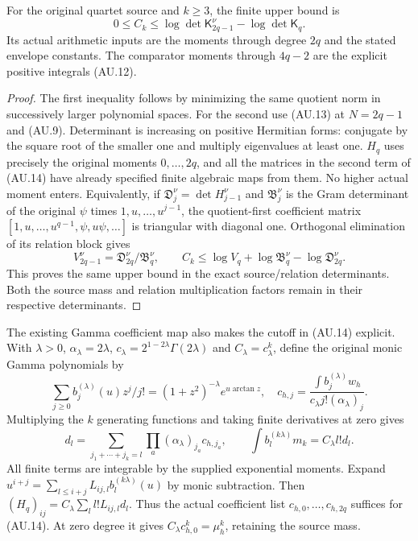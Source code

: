 \begin{theorem}
For the original quartet source and $k\ge3$, the finite upper bound is
\[
 \boxed{0\le C_k\le
 \log\det\mathsf K_{2q-1}^\nu-\log\det\mathsf K_q.}        \tag{AU.14}
\]
Its actual arithmetic inputs are the moments through degree $2q$ and
the stated envelope constants. The comparator moments through $4q-2$
are the explicit positive integrals (AU.12).
\end{theorem}
\begin{proof}
The first inequality follows by minimizing the same quotient norm in
successively larger polynomial spaces. For the second use (AU.13) at
$N=2q-1$ and (AU.9). Determinant is increasing on positive Hermitian
forms: conjugate by the square root of the smaller one and multiply
eigenvalues at least one. $H_q$ uses precisely the original moments
$0,\ldots,2q$, and all the matrices in the second term of (AU.14) have
already specified finite algebraic maps from them. No higher actual
moment enters. Equivalently, if $\mathfrak D^\nu_j=\det H_{j-1}^\nu$
and $\mathfrak B^\nu_j$ is the Gram determinant of the original
$\psi$ times $1,u,\ldots,u^{j-1}$, the quotient-first coefficient
matrix $[1,u,\ldots,u^{q-1},\psi,u\psi,\ldots]$ is triangular with
diagonal one. Orthogonal elimination of its relation block gives
\[
 V_{2q-1}^\nu=\mathfrak D^\nu_{2q}/\mathfrak B^\nu_q,
 \qquad C_k\le\log V_q+
             \log\mathfrak B^\nu_q-\log\mathfrak D^\nu_{2q}.
 \tag{AU.15}
\]
This proves the same upper bound in the exact source/relation
determinants. Both the source mass and relation multiplication factors
remain in their respective determinants.
\end{proof}

The existing Gamma coefficient map also makes the cutoff in (AU.14)
explicit. With $\lambda>0$, $\alpha_\lambda=2\lambda$,
$c_\lambda=2^{1-2\lambda}\Gamma(2\lambda)$ and $C_\lambda=c_\lambda^k$,
define the original monic Gamma polynomials by
\[
 \sum_{j\ge0}b_j^{(\lambda)}(u)z^j/j!
 =(1+z^2)^{-\lambda}e^{u\arctan z},\quad
 c_{h,j}=\frac{\int b_j^{(\lambda)}w_h}
 {c_\lambda j!(\alpha_\lambda)_j}.
\]
Multiplying the $k$ generating functions and taking finite derivatives
at zero gives
\[
 d_l=\sum_{j_1+\cdots+j_k=l}\prod_a(\alpha_\lambda)_{j_a}c_{h,j_a},
 \qquad \int b_l^{(k\lambda)}m_k=C_\lambda l!d_l.          \tag{AU.16}
\]
All finite terms are integrable by the supplied exponential moments.
Expand $u^{i+j}=\sum_{l\le i+j}L_{ij,l}b_l^{(k\lambda)}(u)$ by monic
subtraction. Then $(H_q)_{ij}=C_\lambda\sum_l l!L_{ij,l}d_l$.
Thus the actual coefficient list $c_{h,0},\ldots,c_{h,2q}$ suffices
for (AU.14). At zero degree it gives
$C_\lambda c_{h,0}^k=\mu_h^k$, retaining the source mass.


